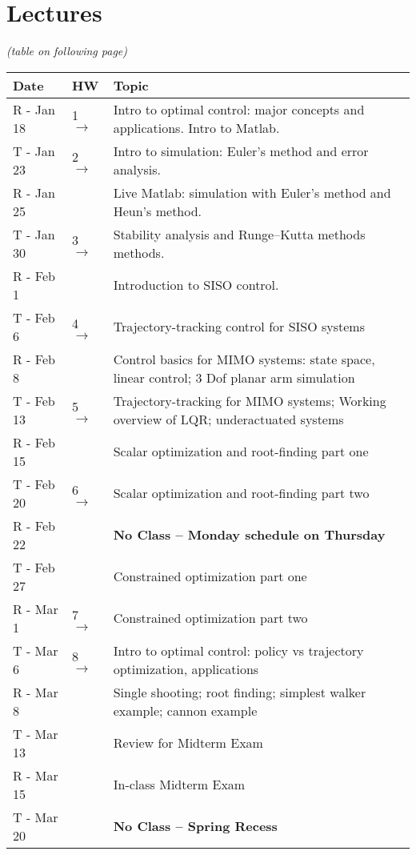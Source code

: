 \documentclass[onecolumn]{article}
\newcommand{\ra}{$\rightarrow$}
\begin{document}
\section*{Lectures}
\textit{(table on following page)}
\begin{table}
  \renewcommand{\arraystretch}{1.2}%
  \begin{tabular}{l|l|l}
    \textbf{Date} & \textbf{HW} & \textbf{Topic} \\
    \hline
    R - Jan 18 & 1 \ra & Intro to optimal control: major concepts and applications. Intro to Matlab. \\
    \hline
    T - Jan 23 & 2 \ra & Intro to simulation: Euler's method and error analysis. \\
    R - Jan 25 &       & Live Matlab: simulation with Euler's method and Heun's method.\\
    T - Jan 30 & 3 \ra & Stability analysis and Runge--Kutta methods methods.\\
    \hline
    R - Feb 1  &       & Introduction to SISO control. \\
    T - Feb 6  & 4 \ra & Trajectory-tracking control for SISO systems \\
    R - Feb 8  &       & Control basics for MIMO systems: state space, linear control; 3 Dof planar arm simulation  \\
    T - Feb 13 & 5 \ra & Trajectory-tracking for MIMO systems; Working overview of LQR; underactuated systems \\
    \hline
    R - Feb 15 &       &  Scalar optimization and root-finding part one\\
    T - Feb 20 & 6 \ra &  Scalar optimization and root-finding part two\\
    R - Feb 22 &       & \textbf{No Class -- Monday schedule on Thursday} \\
    T - Feb 27 &       & Constrained optimization part one \\
    R - Mar 1  & 7 \ra & Constrained optimization part two \\
    \hline
    T - Mar 6  & 8 \ra & Intro to optimal control: policy vs trajectory optimization, applications \\
    R - Mar 8  &       & Single shooting; root finding; simplest walker example; cannon example \\
    T - Mar 13 &       & Review for Midterm Exam \\
    R - Mar 15 &       & In-class Midterm Exam \\
    \hline
    T - Mar 20 &       & \textbf{No Class -- Spring Recess} \\

\end{tabular}
\end{table}
\end{document}

